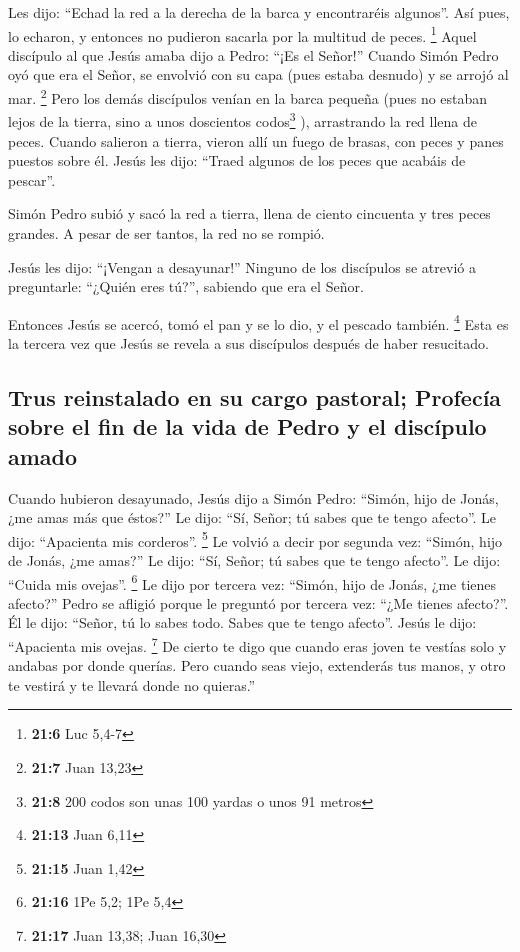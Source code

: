  Les dijo: ``Echad la red a la derecha de la barca y
encontraréis algunos''. Así pues, lo echaron, y entonces no pudieron
sacarla por la multitud de peces. \footnote{\textbf{21:6} Luc 5,4-7}
 Aquel discípulo al que Jesús amaba dijo a Pedro: ``¡Es el
Señor!'' Cuando Simón Pedro oyó que era el Señor, se envolvió con su
capa (pues estaba desnudo) y se arrojó al mar. \footnote{\textbf{21:7}
  Juan 13,23}  Pero los demás discípulos venían en la
barca pequeña (pues no estaban lejos de la tierra, sino a unos
doscientos codos\footnote{\textbf{21:8} 200 codos son unas 100 yardas o
  unos 91 metros} ), arrastrando la red llena de peces. 
Cuando salieron a tierra, vieron allí un fuego de brasas, con peces y
panes puestos sobre él.  Jesús les dijo: ``Traed algunos
de los peces que acabáis de pescar''.

 Simón Pedro subió y sacó la red a tierra, llena de
ciento cincuenta y tres peces grandes. A pesar de ser tantos, la red no
se rompió.

 Jesús les dijo: ``¡Vengan a desayunar!'' Ninguno de los
discípulos se atrevió a preguntarle: ``¿Quién eres tú?'', sabiendo que
era el Señor.

 Entonces Jesús se acercó, tomó el pan y se lo dio, y el
pescado también. \footnote{\textbf{21:13} Juan 6,11} 
Esta es la tercera vez que Jesús se revela a sus discípulos después de
haber resucitado.

\hypertarget{trus-reinstalado-en-su-cargo-pastoral-profecuxeda-sobre-el-fin-de-la-vida-de-pedro-y-el-discuxedpulo-amado}{%
\subsection{Trus reinstalado en su cargo pastoral; Profecía sobre el fin
de la vida de Pedro y el discípulo
amado}\label{trus-reinstalado-en-su-cargo-pastoral-profecuxeda-sobre-el-fin-de-la-vida-de-pedro-y-el-discuxedpulo-amado}}

 Cuando hubieron desayunado, Jesús dijo a Simón Pedro:
``Simón, hijo de Jonás, ¿me amas más que éstos?'' Le dijo: ``Sí, Señor;
tú sabes que te tengo afecto''. Le dijo: ``Apacienta mis corderos''.
\footnote{\textbf{21:15} Juan 1,42}  Le volvió a decir
por segunda vez: ``Simón, hijo de Jonás, ¿me amas?'' Le dijo: ``Sí,
Señor; tú sabes que te tengo afecto''. Le dijo: ``Cuida mis ovejas''.
\footnote{\textbf{21:16} 1Pe 5,2; 1Pe 5,4}  Le dijo por
tercera vez: ``Simón, hijo de Jonás, ¿me tienes afecto?'' Pedro se
afligió porque le preguntó por tercera vez: ``¿Me tienes afecto?''. Él
le dijo: ``Señor, tú lo sabes todo. Sabes que te tengo afecto''. Jesús
le dijo: ``Apacienta mis ovejas. \footnote{\textbf{21:17} Juan 13,38;
  Juan 16,30}  De cierto te digo que cuando eras joven te
vestías solo y andabas por donde querías. Pero cuando seas viejo,
extenderás tus manos, y otro te vestirá y te llevará donde no quieras.''

